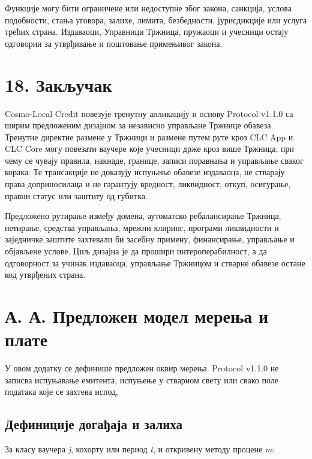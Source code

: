\documentclass[11pt]{article}
\begin{document}
Функције могу бити ограничене или недоступне због закона, санкција, услова подобности, стања уговора, залихе, лимита, безбедности, јурисдикције или услуга трећих страна. Издаваоци, Управници Тржница, пружаоци и учесници остају одговорни за утврђивање и поштовање примењивог закона.


\section*{18. Закључак}

Cosmo-Local Credit повезује тренутну апликацију и основу Protocol v1.1.0 са ширим предложеним дизајном за независно управљане Тржнице обавеза. Тренутне директне размене у Тржници и размене путем руте кроз CLC App и CLC Core могу повезати ваучере које учесници држе кроз више Тржница, при чему се чувају правила, накнаде, границе, записи поравнања и управљање сваког корака. Те трансакције не доказују испуњење обавезе издаваоца, не стварају права доприносилаца и не гарантују вредност, ликвидност, откуп, осигурање, правни статус или заштиту од губитка.

Предложено рутирање између домена, аутоматско ребалансирање Тржница, нетирање, средства управљања, мрежни клиринг, програми ликвидности и заједничке заштите захтевали би засебну примену, финансирање, управљање и објављене услове. Циљ дизајна је да прошири интероперабилност, а да одговорност за учинак издаваоца, управљање Тржницом и стварне обавезе остане код утврђених страна.


\section*{А. А. Предложен модел мерења и плате}

У овом додатку се дефинише предложен оквир мерења. Protocol v1.1.0 не записва испуњавање емитента, испуњење у стварном свету или свако поле података које се захтева испод.

\subsection*{Дефиниције догађаја и залиха}

За класу ваучера \emph{j}, кохорту или период \emph{t}, и откривену методу процене \emph{m}:
\end{document}
